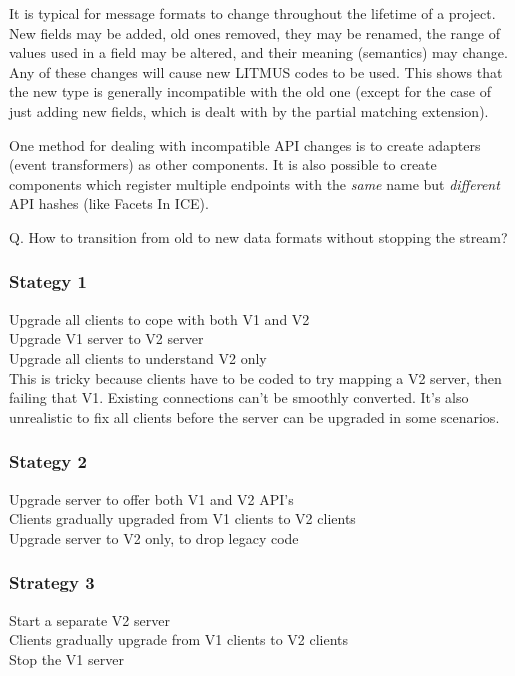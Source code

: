 \documentclass[12pt,a4paper,twoside]{article}
\renewcommand{\_}{\texttt{\symbol{95}}}
\begin{document}
It is typical for message formats to change throughout the lifetime of
a project. New fields may be added, old ones removed, they may be
renamed, the range of values used in a field may be altered, and their
meaning (semantics) may change. Any of these changes will cause new
LITMUS codes to be used. This shows that the new type is generally
incompatible with the old one (except for the case of just adding new
fields, which is dealt with by the partial matching extension).

One method for dealing with incompatible API changes is to
create adapters (event transformers) as other components.
It is also possible to create components which register multiple
endpoints with the \textit{same} name but \textit{different} API hashes
(like Facets In ICE).

Q. How to transition from old to new data formats without stopping
the stream?

\subsubsection*{Stategy 1}

Upgrade all clients to cope with both V1 and V2\\
Upgrade V1 server to V2 server\\
Upgrade all clients to understand V2 only\\

This is tricky because clients have to be coded to try mapping a
V2 server, then failing that V1. Existing connections can't be
smoothly converted. It's also unrealistic to fix all clients before
the server can be upgraded in some scenarios.

\subsubsection*{Stategy 2}

Upgrade server to offer both V1 and V2 API's\\
Clients gradually upgraded from V1 clients to V2 clients\\
Upgrade server to V2 only, to drop legacy code\\

\subsubsection*{Strategy 3}

Start a separate V2 server\\
Clients gradually upgrade from V1 clients to V2 clients\\
Stop the V1 server\\
\end{document}
